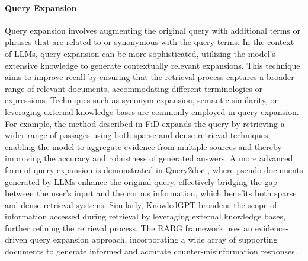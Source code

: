 \paragraph{Query Expansion} Query expansion involves augmenting the original query with additional terms or phrases that are related to or synonymous with the query terms. In the context of LLMs, query expansion can be more sophisticated, utilizing the model's extensive knowledge to generate contextually relevant expansions. This technique aims to improve recall by ensuring that the retrieval process captures a broader range of relevant documents, accommodating different terminologies or expressions. Techniques such as synonym expansion, semantic similarity, or leveraging external knowledge bases are commonly employed in query expansion. For example, the method described in FiD \cite{izacard2021leveraging} expands the query by retrieving a wider range of passages using both sparse and dense retrieval techniques, enabling the model to aggregate evidence from multiple sources and thereby improving the accuracy and robustness of generated answers. A more advanced form of query expansion is demonstrated in Query2doc \cite{wang2023querydoc}, where pseudo-documents generated by LLMs enhance the original query, effectively bridging the gap between the user's input and the corpus information, which benefits both sparse and dense retrieval systems. Similarly, KnowledGPT \cite{wang2023knowledgpt} broadens the scope of information accessed during retrieval by leveraging external knowledge bases, further refining the retrieval process. The RARG \cite{yue2024evidencedriven} framework uses an evidence-driven query expansion approach, incorporating a wide array of supporting documents to generate informed and accurate counter-misinformation responses.

